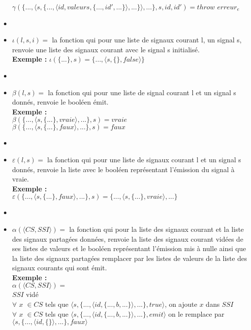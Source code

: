 \documentclass[10pt,a4paper]{article}
\begin{document}
\begin{itemize}
					$\gamma(\{...,\langle s,\{...,\langle id,valeurs,\{...,id',...\}\rangle,...\}\rangle,...\},s,id,id') = throw$ $erreur_{e}$
					\item[]
					\item[] $\iota(l,s,i) =$ la fonction qui pour une liste de signaux courant l, un signal s, renvoie une liste des signaux courant avec le signal s initialisé.
					\\\textbf{Exemple :} $\iota(\{...\},s) = \{...,\langle s,\{\},false\rangle\}$
					\item[]
					\item[] $\beta(l,s) =$ la fonction qui pour une liste de signal courant l et un signal s donnés, renvoie le booléen émit.
					\\\textbf{Exemple :}
					\\ $\beta(\{...,\langle s,\{...\},vraie\rangle,...\},s) = vraie$\\
					$\beta(\{...,\langle s,\{...\},faux\rangle,...\},s) = faux$
					\item[] 
					\item[] $\varepsilon(l,s) =$ la fonction qui pour une liste de signaux courant l et un signal s donnés, renvoie la liste avec le booléen représentant l'émission du signal à vraie.
					\\\textbf{Exemple :}
					\\ $\varepsilon(\{...,\langle s,\{...\},faux\rangle,...\},s) = \{...,\langle s,\{...\},vraie\rangle,...\}$
					\item[] 
					\item[] $\alpha(\langle CS,SSI\rangle) =$ la fonction qui pour la liste des signaux courant et la liste des signaux partagées données, renvoie la liste des signaux courant vidées de ses listes de valeurs et le booléen représentant l'émission mis à nulle ainsi que la liste des signaux partagées remplacer par les listes de valeurs de la liste des signaux courants qui sont émit.
					\\\textbf{Exemple :}
					\\ $\alpha(\langle CS,SSI\rangle) =$
					\\ $SSI$ vidé
					\\ $\forall$ $x$ $\in CS$ tels que $\langle s,\{...,\langle id,\{...,b,...\}\rangle,...\},true\rangle$, on ajoute $x$ dans $SSI$
					\\ $\forall$ $x$ $\in CS$ tels que $\langle s,\{...,\langle id,\{...,b,...\}\rangle,...\},emit\rangle$ on le remplace par $\langle s,\{...,\langle id,\{\}\rangle,...\},faux\rangle$  
				\end{itemize}
				\newpage
		
\end{document}
